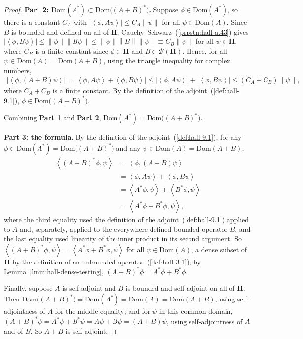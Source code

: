 \begin{proof}
\textbf{Part 2: $\text{Dom}(A^*) \subset \text{Dom}\big( (A+B)^* \big)$.} Suppose $\phi \in \text{Dom}(A^*)$, so there is a constant $C_A$ with $\lvert \left< \phi, A\psi \right> \rvert \le C_A \left\| \psi \right\|$ for all $\psi \in \text{Dom}(A)$. Since $B$ is bounded and defined on all of $\mathbf{H}$, Cauchy–Schwarz~(\ref{prpstn:hall-a.43}) gives $\lvert \left< \phi, B\psi \right> \rvert \le \left\| \phi \right\| \left\| B\psi \right\| \le \left\| \phi \right\| \left\| B \right\| \left\| \psi \right\| \equiv C_B \left\| \psi \right\|$ for all $\psi \in \mathbf{H}$, where $C_B$ is a finite constant since $\phi \in \mathbf{H}$ and $B \in \mathcal{B}(\mathbf{H})$. Hence, for all $\psi \in \text{Dom}(A) = \text{Dom}(A+B)$, using the triangle inequality for complex numbers,
\begin{align}
    \lvert \left< \phi, (A+B)\psi \right> \rvert = \lvert \left< \phi, A\psi \right> + \left< \phi, B\psi \right> \rvert \le \lvert \left< \phi, A\psi \right> \rvert + \lvert \left< \phi, B\psi \right> \rvert \le (C_A + C_B) \left\| \psi \right\|,
\end{align}
where $C_A + C_B$ is a finite constant. By the definition of the adjoint~(\ref{def:hall-9.1}), $\phi \in \text{Dom}\big( (A+B)^* \big)$.

Combining \textbf{Part 1} and \textbf{Part 2}, $\text{Dom}(A^*) = \text{Dom}\big( (A+B)^* \big)$.

\textbf{Part 3: the formula.} By the definition of the adjoint~(\ref{def:hall-9.1}), for any $\phi \in \text{Dom}(A^*) = \text{Dom}\big( (A+B)^* \big)$ and any $\psi \in \text{Dom}(A) = \text{Dom}(A+B)$,
\begin{align}
    \left< (A+B)^*\phi, \psi \right> &= \left< \phi, (A+B)\psi \right> \\
                                     &= \left< \phi, A\psi \right> + \left< \phi, B\psi \right> \\
                                     &= \left< A^*\phi, \psi \right> + \left< B^*\phi, \psi \right> \\
                                     &= \left< A^*\phi + B^*\phi, \psi \right>,
\end{align}
where the third equality used the definition of the adjoint~(\ref{def:hall-9.1}) applied to $A$ and, separately, applied to the everywhere-defined bounded operator $B$, and the last equality used linearity of the inner product in its second argument. So $\left< (A+B)^*\phi, \psi \right> = \left< A^*\phi + B^*\phi, \psi \right>$ for all $\psi \in \text{Dom}(A)$, a dense subset of $\mathbf{H}$ by the definition of an unbounded operator~(\ref{def:hall-3.1}); by Lemma~\ref{lmm:hall-dense-testing}, $(A+B)^*\phi = A^*\phi + B^*\phi$.

Finally, suppose $A$ is self-adjoint and $B$ is bounded and self-adjoint on all of $\mathbf{H}$. Then $\text{Dom}\big( (A+B)^* \big) = \text{Dom}(A^*) = \text{Dom}(A) = \text{Dom}(A+B)$, using self-adjointness of $A$ for the middle equality; and for $\psi$ in this common domain, $(A+B)^*\psi = A^*\psi + B^*\psi = A\psi + B\psi = (A+B)\psi$, using self-adjointness of $A$ and of $B$. So $A+B$ is self-adjoint.
\end{proof}

